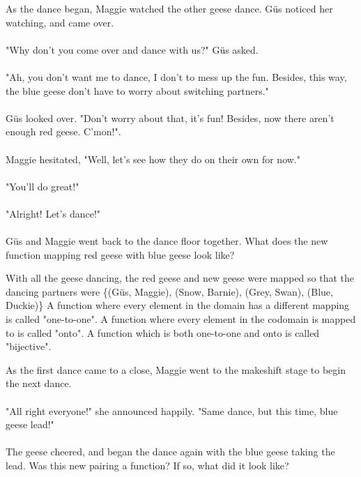 {As the dance began, Maggie watched the other geese dance. Güs noticed her watching, and came over. 
\paragraph{} "Why don't you come over and dance with us?" Güs asked. 
\paragraph{} "Ah, you don't want me to dance, I don't to mess up the fun. Besides, this way, the blue geese don't have to worry about switching partners."
\paragraph{} Güs looked over. "Don't worry about that, it's fun! Besides, now there aren't enough red geese. C'mon!".
\paragraph{} Maggie hesitated, "Well, let's see how they do on their own for now."
\paragraph{} "You'll do great!"
\paragraph{} "Alright! Let's dance!" 
\paragraph{} Güs and Maggie went back to the dance floor together. 
What does the new function mapping red geese with blue geese look like?}
{With all the geese dancing, the red geese and new geese were mapped so that the dancing partners were \{(Güs, Maggie), (Snow, Barnie), (Grey, Swan), (Blue, Duckie)\}}
{A function where every element in the domain has a different mapping is called "one-to-one". A function where every element in the codomain is mapped to is called "onto". A function which is both one-to-one and onto is called "bijective".}
{}
{As the first dance came to a close, Maggie went to the makeshift stage to begin the next dance.  
\paragraph{} "All right everyone!" she announced happily. "Same dance, but this time, blue geese lead!" 
\paragraph{} The geese cheered, and began the dance again with the blue geese taking the lead. Was this new pairing a function? If so, what did it look like?}

